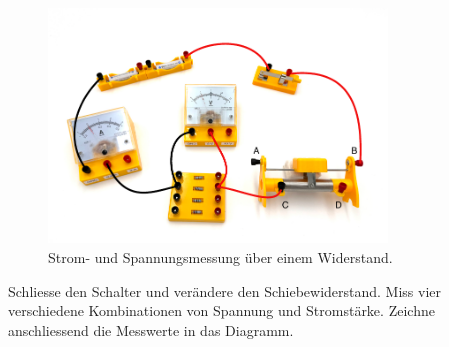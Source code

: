 \begin{figure}[h!]
    \centering
    \includegraphics[width=9cm]{_images/ohm_gesetz.pdf}
    \caption{Strom- und Spannungsmessung über einem Widerstand.}
    \label{fig:ohm_law}
\end{figure}

Schliesse den Schalter und verändere den Schiebewiderstand. Miss vier verschiedene
Kombinationen von Spannung und Stromstärke. Zeichne anschliessend die Messwerte
in das Diagramm.

